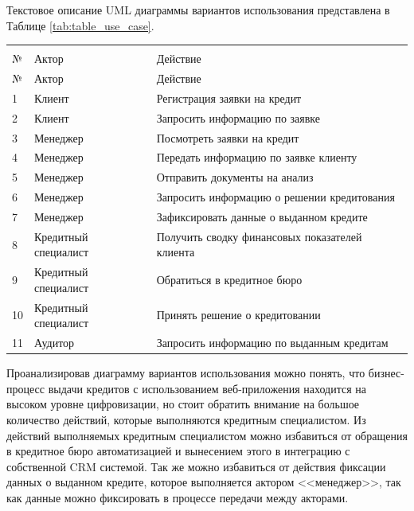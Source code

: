 \documentclass[14pt, a4paper]{extarticle}
\begin{document}
Текстовое описание UML диаграммы вариантов использования представлена в Таблице
\ref{tab:table_use_case}.

\begin{tabularx}{\textwidth}{|l|X|X|}
	\captionsetup{margin=-14pt}
	\caption{Текстовое описание вариантов использования\label{tab:table_use_case}}
	\\
	\endfirsthead
	\caption*{Продолжение таблицы~\ref{tab:table_use_case}}                 \\
	\hline
	№  & Актор                & Действие                                    \\\hline
	\endhead
	\endfoot
	\endlastfoot

	\hline
	№  & Актор                & Действие                                    \\\hline
	1  & Клиент               & Регистрация заявки на кредит                \\\hline
	2  & Клиент               & Запросить информацию по заявке              \\\hline
	3  & Менеджер             & Посмотреть заявки на кредит                 \\
	4  & Менеджер             & Передать информацию по заявке клиенту       \\\hline
	5  & Менеджер             & Отправить документы на анализ               \\\hline
	6  & Менеджер             & Запросить информацию о решении кредитования \\\hline
	7  & Менеджер             & Зафиксировать данные о выданном кредите     \\\hline
	8  & Кредитный специалист & Получить сводку финансовых показателей
	клиента                                                                 \\\hline
	9  & Кредитный специалист & Обратиться в кредитное бюро                 \\\hline
	10 & Кредитный специалист & Принять решение о кредитовании              \\\hline
	11 & Аудитор              & Запросить информацию по выданным кредитам   \\\hline
\end{tabularx}

Проанализировав диаграмму вариантов использования можно понять, что
бизнес-процесс выдачи кредитов с использованием веб-приложения находится на
высоком уровне цифровизации, но стоит обратить внимание на большое количество
действий, которые выполняются кредитным специалистом. Из действий выполняемых
кредитным специалистом можно избавиться от обращения в кредитное бюро
автоматизацией и вынесением этого в интеграцию с собственной CRM системой. Так
же можно избавиться от действия фиксации данных о выданном кредите, которое
выполняется актором <<менеджер>>, так как данные можно фиксировать в процессе
передачи между акторами.
\end{document}
